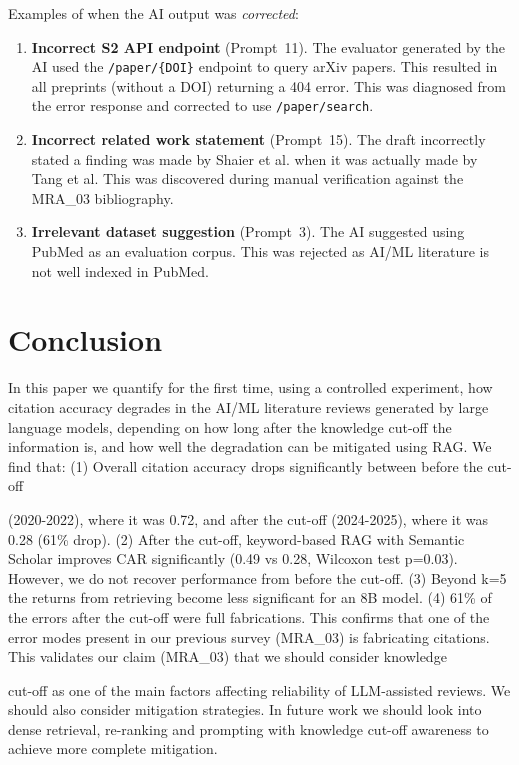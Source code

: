 \documentclass[conference]{IEEEtran}
\begin{document}
Examples of when the AI output was \emph{corrected}:

\begin{enumerate}[leftmargin=*,topsep=2pt]
\item \textbf{Incorrect S2 API endpoint} (Prompt~11). The evaluator
generated by the AI used the \texttt{/paper/\{DOI\}} endpoint to query
arXiv papers. This resulted in all preprints (without a DOI) returning
a 404 error. This was diagnosed from the error response and corrected to
use \texttt{/paper/search}.
\item \textbf{Incorrect related work statement} (Prompt~15). The draft
incorrectly stated a finding was made by Shaier et al. when it was
actually made by Tang et al. This was discovered during manual
verification against the MRA\_03 bibliography.
\item \textbf{Irrelevant dataset suggestion} (Prompt~3). The AI suggested
using PubMed as an evaluation corpus. This was rejected as AI/ML
literature is not well indexed in PubMed.
\end{enumerate}

\section{Conclusion}
\label{sec:conclusion}

In this paper we quantify for the first time, using a controlled experiment,
how citation accuracy degrades in the AI/ML literature reviews generated
by large language models, depending on how long after the knowledge cut-off
the information is, and how well the degradation can be mitigated using
RAG.
We find that:
(1) Overall citation accuracy drops significantly between before the cut-off

(2020-2022), where it was 0.72, and after the cut-off (2024-2025), where
it was 0.28 (61\% drop).
(2) After the cut-off, keyword-based RAG with Semantic Scholar improves
CAR significantly (0.49 vs 0.28, Wilcoxon test p=0.03). However, we do
not recover performance from before the cut-off.
(3) Beyond k=5 the returns from retrieving become less significant for
an 8B model.
(4) 61\% of the errors after the cut-off were full fabrications. This confirms
that one of the error modes present in our previous survey (MRA\_03) is
fabricating citations.
This validates our claim (MRA\_03) that we should consider knowledge

cut-off as one of the main factors affecting reliability of LLM-assisted
reviews. We should also consider mitigation strategies. In future work
we should look into dense retrieval, re-ranking and prompting with knowledge
cut-off awareness to achieve more complete mitigation.






\end{document}
